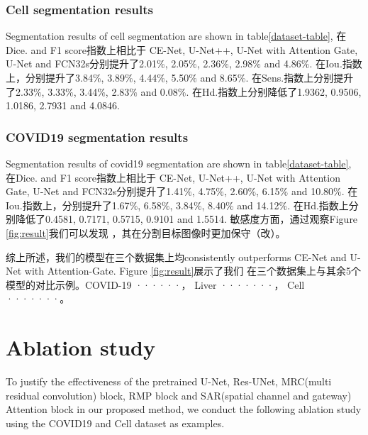 \documentclass[UTF8]{article} %
\begin{document}
\subsubsection{Cell segmentation results}
Segmentation results of cell segmentation are shown in table\ref{dataset-table}, 在Dice. and F1 score指数上相比于
CE-Net, U-Net++, U-Net with Attention Gate, U-Net and FCN32s分别提升了2.01\(\%\), 2.05\(\%\), 2.36\(\%\), 2.98\(\%\) and 4.86\(\%\).
在Iou.指数上，分别提升了3.84\(\%\), 3.89\(\%\), 4.44\(\%\), 5.50\(\%\) and 8.65\(\%\). 在Sens.指数上分别提升了2.33\(\%\), 3.33\(\%\), 3.44\(\%\), 
2.83\(\%\) and 0.08\(\%\). 在Hd.指数上分别降低了1.9362, 0.9506, 1.0186, 2.7931 and 4.0846.

  \subsubsection{COVID19 segmentation results}
  Segmentation results of covid19 segmentation are shown in table\ref{dataset-table}, 在Dice. and F1 score指数上相比于
  CE-Net, U-Net++, U-Net with Attention Gate, U-Net and FCN32s分别提升了1.41\(\%\), 4.75\(\%\), 2.60\(\%\), 6.15\(\%\) and 10.80\(\%\).
  在Iou.指数上，分别提升了1.67\(\%\), 6.58\(\%\), 3.84\(\%\), 8.40\(\%\) and 14.12\(\%\). %
  在Hd.指数上分别降低了0.4581, 0.7171, 0.5715, 0.9101 and 1.5514. 敏感度方面，通过观察Figure \ref{fig:result}我们可以发现
  ，其在分割目标图像时更加保守（改）。


  综上所述，我们的模型在三个数据集上均consistently outperforms CE-Net and U-Net with Attention-Gate. Figure \ref{fig:result}展示了我们
  在三个数据集上与其余5个模型的对比示例。COVID-19 ······， Liver ·······， Cell ·······。

  \section{Ablation study}
  To justify the effectiveness of the pretrained U-Net\cite{unet}, Res-UNet\cite{ResUNet}, 
  MRC(multi residual convolution) block, RMP block and SAR(spatial channel and gateway) Attention block
  in our proposed method, we conduct the following ablation study using the COVID19 and Cell dataset as examples.
\end{document}
